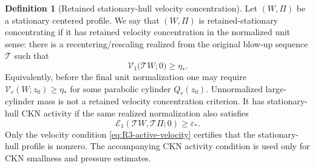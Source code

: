 \documentclass[11pt]{amsart}
\numberwithin{equation}{section}
\theoremstyle{plain}
\theoremstyle{definition}
\newtheorem{definition}[definition]{Definition}
\theoremstyle{remark}
\newcommand{\eps}{\varepsilon}
\newcommand{\calE}{\mathcal E}
\newcommand{\Vel}{\mathcal V}
\begin{document}
\begin{definition}[Retained stationary-hull velocity concentration]
\label{def:R3-active-profile}
Let \((W,\Pi)\) be a stationary centered profile.  We say that \((W,\Pi)\) is
retained-stationary concentrating if it has retained velocity concentration in the normalized
unit sense: there is a recentering/rescaling realized from the original blow-up
sequence
\(\mathscr T\) such that
\begin{equation}\label{eq:R3-active-velocity}
   \Vel_1\bigl(\mathscr T W;0\bigr)
   \ge \eta_* .
\end{equation}
Equivalently, before the final unit normalization one may require
\(\Vel_r(W;z_0)\ge\eta_*\) for some parabolic cylinder
\(Q_r(z_0)\).  Unnormalized large-cylinder mass is not a retained velocity concentration
criterion.
It has stationary-hull CKN activity if the same realized
normalization also satisfies
\[
   \calE_1(\mathscr T W,\mathscr T\Pi;0)\ge\eps_* .
\]
Only the velocity condition \eqref{eq:R3-active-velocity} certifies that the
stationary-hull profile is nonzero.  The accompanying CKN activity condition is
used only for CKN smallness and pressure estimates.
\end{definition}
\end{document}
